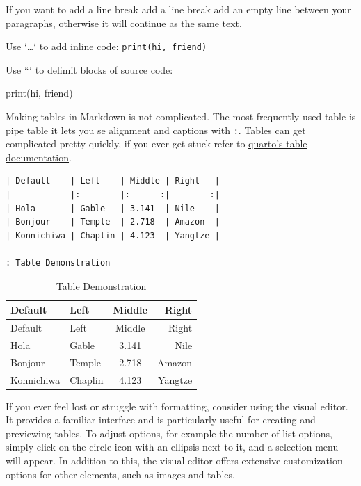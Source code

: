 \documentclass[
  letterpaper,
]{book}
\newenvironment{Shaded}{\begin{snugshade}}{\end{snugshade}}
\newcommand{\NormalTok}[1]{\textcolor[rgb]{0.00,0.23,0.31}{#1}}
\begin{document}
If you want to add a line break add a line break add an empty line
between your paragraphs, otherwise it will continue as the same text.

Use `\ldots` to add inline code: \texttt{print(hi,\ friend)}

Use ``` to delimit blocks of source code:

\begin{Shaded}
\begin{Highlighting}[]
\NormalTok{\textasciigrave{}\textasciigrave{}\textasciigrave{}}
\NormalTok{print(hi, friend)}
\NormalTok{\textasciigrave{}\textasciigrave{}\textasciigrave{}}
\end{Highlighting}
\end{Shaded}

Making tables in Markdown is not complicated. The most frequently used
table is pipe table it lets you se alignment and captions with
\texttt{:}. Tables can get complicated pretty quickly, if you ever get
stuck refer to
\href{https://quarto.org/docs/authoring/tables.html}{quarto's table
documentation}.

\begin{verbatim}
| Default    | Left    | Middle | Right   | 
|------------|:--------|:------:|--------:|
| Hola       | Gable   | 3.141  | Nile    | 
| Bonjour    | Temple  | 2.718  | Amazon  | 
| Konnichiwa | Chaplin | 4.123  | Yangtze | 

: Table Demonstration
\end{verbatim}

\begin{longtable}[]{@{}llcr@{}}
\caption{Table Demonstration}\tabularnewline
\toprule()
Default & Left & Middle & Right \\
\midrule()
\endfirsthead
\toprule()
Default & Left & Middle & Right \\
\midrule()
\endhead
Hola & Gable & 3.141 & Nile \\
Bonjour & Temple & 2.718 & Amazon \\
Konnichiwa & Chaplin & 4.123 & Yangtze \\
\bottomrule()
\end{longtable}

If you ever feel lost or struggle with formatting, consider using the
visual editor. It provides a familiar interface and is particularly
useful for creating and previewing tables. To adjust options, for
example the number of list options, simply click on the circle icon with
an ellipsis next to it, and a selection menu will appear. In addition to
this, the visual editor offers extensive customization options for other
elements, such as images and tables.
\end{document}
